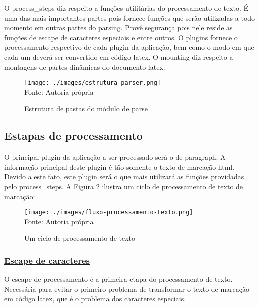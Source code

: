 O process\_steps diz respeito a funções utilitárias do processamento de texto.
É uma das mais importantes partes pois fornece funções que serão utilizadas a todo
momento em outras partes do parsing. Provê segurança pois nele reside as funções
de escape de caracteres especiais e entre outros.
O plugins fornece o processamento respectivo de cada plugin da aplicação,
bem como o modo em que cada um deverá ser convertido em código
\acrshort{latex}.
O mounting diz respeito a montagens de partes dinâmicas do documento
\acrshort{latex}.

\begin{figure}[H]
    \centering
    \caption{Estrutura de pastas do módulo de parse}
    \texttt{[image: ./images/estrutura-parser.png]}
    \label{fig:estrutura-parser} \\
    \textnormal{\fontsize{10pt}{12pt}Fonte: Autoria própria}
\end{figure}

\subsection{Estapas de processamento}

O principal plugin da aplicação a ser processado será o de paragraph.
A informação principal deste plugin é tão somente o texto de marcação
\acrshort{html}. Devido a este fato, este plugin
será o que mais utilizará as funções providadas pelo process\_steps.
A
Figura \ref{fig:fluxo-processamento-texto}
ilustra um ciclo de processamento de texto de marcação:

\begin{figure}[H]
    \centering
    \caption{Um ciclo de processamento de texto}
    \texttt{[image: ./images/fluxo-processamento-texto.png]}
    \label{fig:fluxo-processamento-texto} \\
    \textnormal{\fontsize{10pt}{12pt}Fonte: Autoria própria}
\end{figure}



\subsubsection{\underline{Escape de caracteres}}

O escape de processamento é a primeira etapa do processamento
de texto. Necessária para evitar o primeiro problema de transformar
o texto de marcação em código
\acrshort{latex},
que é o problema dos caracteres especiais.

